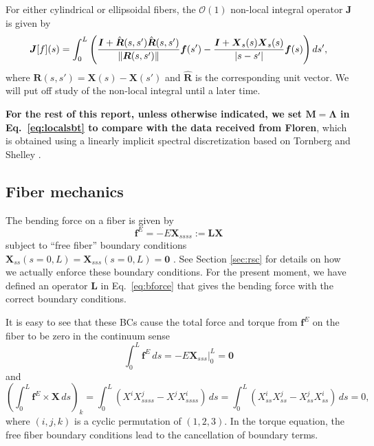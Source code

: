For either cylindrical or ellipsoidal fibers, the $\mathcal{O}(1)$ non-local integral operator $\bm{J}$ is given by
\begin{equation}
\label{eq:intsbt}
\boldsymbol{J}[f](s) = \int_0^L \left(\frac{\boldsymbol{I}+\hat{\boldsymbol{R}}(s,s')\hat{\boldsymbol{R}}(s,s')}{\left\Vert \boldsymbol{R}(s,s')\right\Vert}\boldsymbol{f}(s') - \frac{\boldsymbol{I}+\boldsymbol{X}_s(s) \boldsymbol{X}_s(s)}{|s-s'|} \boldsymbol{f}(s) \right) ds',
\end{equation}
where $\bm{R}(s,s')=\bm{X}(s)-\bm{X}(s')$ and $\hat{\bm{R}}$ is the corresponding unit vector. We will put off study of the non-local integral until a later time. 

\textbf{For the rest of this report, unless otherwise indicated, we set $\bm{M}=\bm{\Lambda}$ in Eq.\ \eqref{eq:localsbt} to compare with the data received from Floren}, which is obtained using a linearly implicit spectral discretization based on Tornberg and Shelley \cite{ts04}.

\subsection{Fiber mechanics}
The bending force on a fiber is given by
\begin{equation}
\label{eq:bforce}
    \bm{f}^E=-E\bm{X}_{ssss} :=\bm{L}\bm{X}
\end{equation}
subject to ``free fiber'' boundary conditions $\displaystyle \bm{X}_{ss}\left(s=0,L\right)=\bm{X}_{sss}\left(s=0,L\right)=\bm{0}$ \cite{ehssan17}. See Section \ref{sec:rsc} for details on how we actually enforce these boundary conditions. For the present moment, we have defined an operator $\bm{L}$ in Eq.\ \eqref{eq:bforce} that gives the bending force with the correct boundary conditions. 

It is easy to see that these BCs cause the total force and torque from $\bm{f}^E$ on the fiber to be zero in the continuum sense
\begin{equation}
\label{eq:totfe}
\int_{0}^{L} \bm{f}^E \, ds = -E\bm{X}_{sss}\Big \rvert^{L}_{0} = \bm{0}
\end{equation}
and 
\begin{equation}
\label{eq:tottfe}
\left(\int_{0}^{L} \bm{f}^E \times {\bm{X}}\, ds\right)_k = \int_{0}^{L} \left(X^i X^j_{ssss} - X^j X^i _{ssss}\right) \, ds =  \int_{0}^{L} \left(X^i_{ss} X^j_{ss} - X^j_{ss} X^i _{ss}\right) \, ds = 0, 
\end{equation}
where $(i,j,k)$ is a cyclic permutation of $(1,2,3)$. In the torque equation, the free fiber boundary conditions lead to the cancellation of boundary terms.

